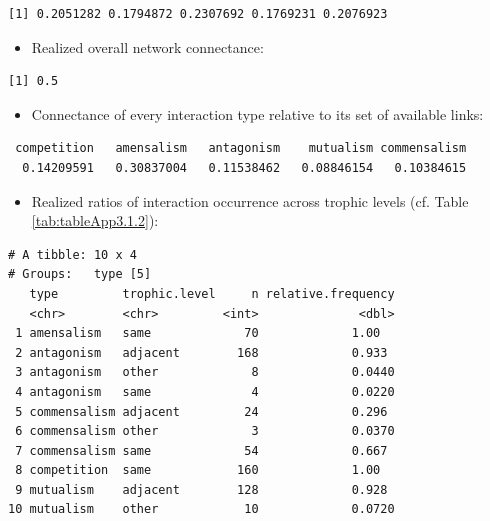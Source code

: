 \begin{verbatim}
[1] 0.2051282 0.1794872 0.2307692 0.1769231 0.2076923
\end{verbatim}

\normalsize

\begin{itemize}
\tightlist
\item
  Realized overall network connectance:\\
   \small
\end{itemize}

\begin{verbatim}
[1] 0.5
\end{verbatim}

\normalsize

\begin{itemize}
\tightlist
\item
  Connectance of every interaction type relative to its set of available
  links:\\
   \small
\end{itemize}

\begin{verbatim}
 competition   amensalism   antagonism    mutualism commensalism
  0.14209591   0.30837004   0.11538462   0.08846154   0.10384615
\end{verbatim}

\normalsize

\begin{itemize}
\tightlist
\item
  Realized ratios of interaction occurrence across trophic levels
  (cf. Table \ref{tab:tableApp3.1.2}):\\
   \small
\end{itemize}

\begin{verbatim}
# A tibble: 10 x 4
# Groups:   type [5]
   type         trophic.level     n relative.frequency
   <chr>        <chr>         <int>              <dbl>
 1 amensalism   same             70             1.00
 2 antagonism   adjacent        168             0.933
 3 antagonism   other             8             0.0440
 4 antagonism   same              4             0.0220
 5 commensalism adjacent         24             0.296
 6 commensalism other             3             0.0370
 7 commensalism same             54             0.667
 8 competition  same            160             1.00
 9 mutualism    adjacent        128             0.928
10 mutualism    other            10             0.0720
\end{verbatim}

